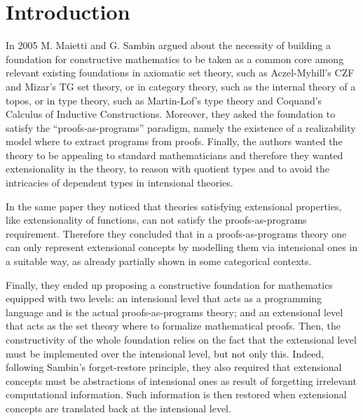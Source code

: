 
%

\section*{Introduction}

In 2005 M.\! Maietti and G. Sambin \cite{maietti2005toward} argued about the necessity of building a foundation for constructive mathematics to be taken as a common core among relevant existing foundations in axiomatic set theory, such as Aczel-Myhill's CZF and Mizar's TG set theory, or in category theory, such as the internal theory of a topos, or in type theory, such as Martin-Lof’s type theory and Coquand’s Calculus of Inductive Constructions. 
Moreover, they asked the foundation to satisfy the “proofs-as-programs” paradigm, namely the existence of a realizability model where to extract programs from proofs. 
Finally, the authors wanted the theory to be appealing to standard mathematicians and therefore they wanted extensionality in the theory, \eg to reason with quotient types and to avoid the intricacies of dependent types in intensional theories.

In the same paper they noticed that theories satisfying extensional properties, like extensionality of functions, can not satisfy the proofs-as-programs requirement.
Therefore they concluded that in a proofs-as-programs theory one can only represent extensional concepts by modelling them via intensional ones in a suitable way, as already partially shown in some categorical contexts.

Finally, they ended up proposing a constructive foundation for mathematics equipped with two levels: an intensional level that acts as a programming language and is the actual proofs-as-programs theory; and an extensional level that acts as the set theory where to formalize mathematical proofs. Then, the constructivity of the whole foundation relies on the fact that the extensional level must be implemented over the intensional level, but not only this. Indeed, following Sambin’s forget-restore principle, they also required that extensional concepts must be abstractions of intensional ones as result of forgetting irrelevant computational information.
Such information is then restored when extensional concepts are translated back at the intensional level.


